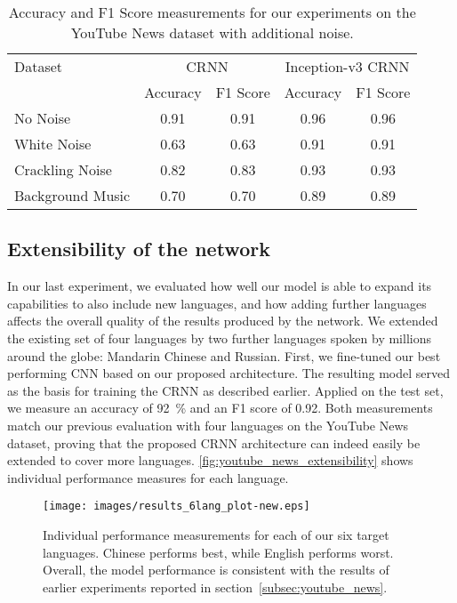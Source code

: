 \documentclass{llncs}
\begin{document}
\begin{table}[t]
	\centering
	\begin{tabular}[t]{l c c c c}
		\toprule
		Dataset & \multicolumn{2}{c}{CRNN} & \multicolumn{2}{c}{Inception-v3 CRNN} \\
		 & Accuracy & F1 Score & Accuracy & F1 Score \\
		\midrule
		No Noise & 0.91 & 0.91 & 0.96 & 0.96 \\
		White Noise & 0.63 & 0.63 & 0.91 & 0.91 \\
		Crackling Noise & 0.82 & 0.83 & 0.93 & 0.93 \\
		Background Music & 0.70 & 0.70 & 0.89 & 0.89 \\
		\bottomrule
	\end{tabular}
	\caption{Accuracy and F1 Score measurements for our experiments on the YouTube News dataset with additional noise.}
	\label{tab:youtube_news_noise_results}
\end{table}

\subsection{Extensibility of the network}

In our last experiment, we evaluated how well our model is able to expand its capabilities to also include new languages, and how adding further languages affects the overall quality of the results produced by the network.
We extended the existing set of four languages by two further languages spoken by millions around the globe: Mandarin Chinese and Russian.
First, we fine-tuned our best performing \ac{CNN} based on our proposed architecture.
The resulting model served as the basis for training the \ac{CRNN} as described earlier.
Applied on the test set, we measure an accuracy of \SI{92}{\percent} and an F1 score of 0.92.
Both measurements match our previous evaluation with four languages on the YouTube News dataset, proving that the proposed \ac{CRNN} architecture can indeed easily be extended to cover more languages. \autoref{fig:youtube_news_extensibility} shows individual performance measures for each language.

\begin{figure}[t]
	\centering
	\texttt{[image: images/results\_6lang\_plot-new.eps]}
	\caption{Individual performance measurements for each of our six target languages. Chinese performs best, while English performs worst. Overall, the model performance is consistent with the results of earlier experiments reported in section~\ref{subsec:youtube_news}.}
	\label{fig:youtube_news_extensibility}
\end{figure}
\end{document}
